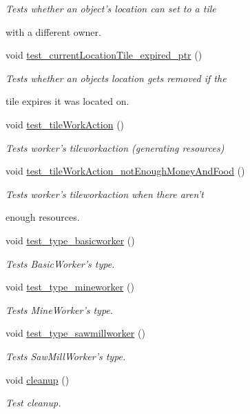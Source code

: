 \begin{DoxyCompactItemize}
\begin{DoxyCompactList}\small\item\em Tests whether an object's location can set to a tile \par
with a different owner. \end{DoxyCompactList}\item 
void \hyperlink{classdefault__worker_a18fa8ce0183ee7fa9d39918c3ee72c6d}{test\-\_\-current\-Location\-Tile\-\_\-expired\-\_\-ptr} ()
\begin{DoxyCompactList}\small\item\em Tests whether an objects location gets removed if the \par
tile expires it was located on. \end{DoxyCompactList}\item 
void \hyperlink{classdefault__worker_a9faf7bd43cb6b07f2be5fbe16ba9c11e}{test\-\_\-tile\-Work\-Action} ()
\begin{DoxyCompactList}\small\item\em Tests worker's tileworkaction (generating resources) \end{DoxyCompactList}\item 
void \hyperlink{classdefault__worker_a130375f5e40f7c8cc24c2da1d0039b3c}{test\-\_\-tile\-Work\-Action\-\_\-not\-Enough\-Money\-And\-Food} ()
\begin{DoxyCompactList}\small\item\em Tests worker's tileworkaction when there aren't \par
enough resources. \end{DoxyCompactList}\item 
void \hyperlink{classdefault__worker_aa23fa13744f7dbfb7a8d6b3f46402b15}{test\-\_\-type\-\_\-basicworker} ()
\begin{DoxyCompactList}\small\item\em Tests Basic\-Worker's type. \end{DoxyCompactList}\item 
void \hyperlink{classdefault__worker_a18bed647358defe17331e70a024bfc61}{test\-\_\-type\-\_\-mineworker} ()
\begin{DoxyCompactList}\small\item\em Tests Mine\-Worker's type. \end{DoxyCompactList}\item 
void \hyperlink{classdefault__worker_a54075e0089e64d81493a9462de924457}{test\-\_\-type\-\_\-sawmillworker} ()
\begin{DoxyCompactList}\small\item\em Tests Saw\-Mill\-Worker's type. \end{DoxyCompactList}\item 
void \hyperlink{classdefault__worker_ac24a55220859638040a6cad7107b044f}{cleanup} ()
\begin{DoxyCompactList}\small\item\em Test cleanup. \end{DoxyCompactList}\end{DoxyCompactItemize}
